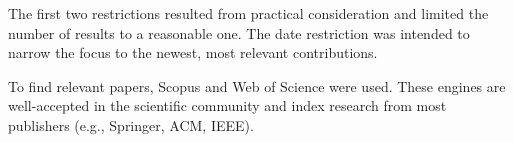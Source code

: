 The first two restrictions resulted from practical consideration and limited the number of results to a reasonable one.
The date restriction was intended to narrow the focus to the newest, most relevant contributions.

To find relevant papers, Scopus and Web of Science were used.
These engines are well-accepted in the scientific community and index research from most publishers (e.g., Springer, ACM, IEEE).
